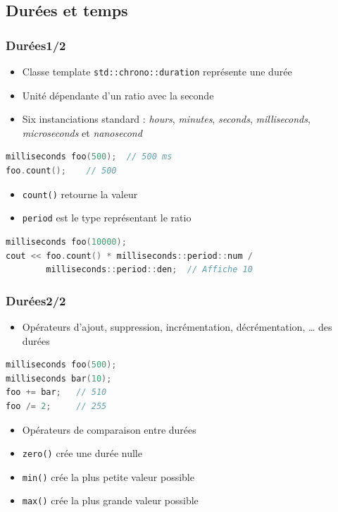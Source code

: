 \documentclass[C++.tex]{subfiles}
\begin{document}
\subsection*{Durées et temps}
\begin{frame}[fragile]
	\frametitle{Durées\titlehfill{}1/2}
	\begin{itemize}
		\item Classe template \lstinline|std::chrono::duration| représente une durée
		\item Unité dépendante d'un ratio avec la seconde
		\item Six instanciations standard : \textit{hours}, \textit{minutes}, \textit{seconds}, \textit{milliseconds}, \textit{microseconds} et \textit{nanosecond}
	\end{itemize}

	\begin{lstlisting}[language=C++]
milliseconds foo(500);  // 500 ms
foo.count();    // 500\end{lstlisting}

	\begin{itemize}
		\item \lstinline|count()| retourne la valeur
		\item \lstinline|period| est le type représentant le ratio
	\end{itemize}

	\begin{lstlisting}[language=C++]
milliseconds foo(10000);
cout << foo.count() * milliseconds::period::num / 
        milliseconds::period::den;  // Affiche 10\end{lstlisting}
\end{frame}

\begin{frame}[fragile]
	\frametitle{Durées\titlehfill{}2/2}
	\begin{itemize}
		\item Opérateurs d'ajout, suppression, incrémentation, décrémentation, \ldots{} des durées
	\end{itemize}

	\begin{lstlisting}[language=C++]
milliseconds foo(500);
milliseconds bar(10);
foo += bar;   // 510
foo /= 2;     // 255\end{lstlisting}

	\begin{itemize}
		\item Opérateurs de comparaison entre durées
		\item \lstinline|zero()| crée une durée nulle
		\item \lstinline|min()| crée la plus petite valeur possible
		\item \lstinline|max()| crée la plus grande valeur possible
	\end{itemize}
\end{frame}
\end{document}
